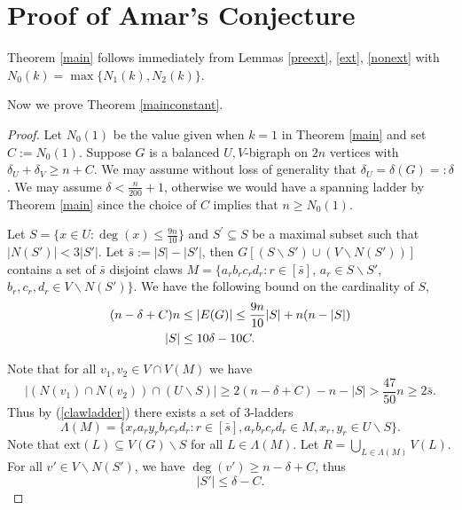 \documentclass[oneside,12pt]{memoir}
\newcommand{\ssm}{\smallsetminus}
\begin{document}
\section{Proof of Amar's Conjecture}

Theorem \ref{main} follows immediately from Lemmas \ref{preext}, \ref{ext}, \ref{nonext} with $N_0(k)=\max\{N_1(k),N_2(k)\}$.

Now we prove Theorem \ref{mainconstant}.%

\begin{proof}

Let $N_0(1)$ be the value given when $k=1$ in Theorem \ref{main} and set $C:=N_0(1)$.  Suppose $G$ is a balanced $U,V$-bigraph on $2n$ vertices with $\delta_U+\delta_V\geq n+C$.  We may assume without loss of generality that $\delta_U=\delta(G)=:\delta$. We may assume $\delta<\frac{n}{200}+1$, otherwise we would have a spanning ladder by Theorem \ref{main} since the choice of $C$ implies that $n\geq N_0(1)$.

Let $S=\{x\in U:\deg(x)\leq\frac{9n}{10}\}$ and $S^{\prime}\subseteq S$ be a maximal subset such that $| N(S')|<3|S'|$.  Let $\bar{s}:=|S|-|S'|$, then $G[(S\smallsetminus S')\cup (V\smallsetminus N(S'))]$ contains a set of $\bar{s}$ disjoint claws $M=\{a_rb_rc_rd_r:r\in[\bar{s}]$, $a_r\in S\ssm S'$, $b_r,c_r,d_r\in V\ssm N(S')\}$.
We have the following bound on the cardinality of $S$,
\begin{align}
(n-\delta+C)n &\leq|E(G)|\leq\frac{9n}{10}| S| +n(n-|S|)\notag \\
|S|&\leq 10\delta-10C.
\end{align}

Note that for all $v_1,v_2\in V\cap V(M)$ we have
\begin{equation}
|(N(v_1)\cap N(v_2))\cap(U\ssm S)|\geq 2(n-\delta+C)-n-|S|>\frac{47}{50}n\geq 2\bar{s}.\label{clawladder}
\end{equation}
Thus by (\ref{clawladder}) there exists a set of $3$-ladders $$\Lambda(M)=\{x_ra_ry_rb_rc_rd_r:r\in[\bar{s}], a_rb_rc_rd_r\in M, x_r,y_r\in U\ssm S\}.$$ Note that $\mathrm{ext}(L)\subseteq V(G)\smallsetminus S$ for all $L\in \Lambda(M)$.  Let $R=\bigcup_{L\in \Lambda(M)}V(L)$.  For all $v'\in V\ssm N(S')$, we have $\deg(v')\geq n-\delta+C$, thus 
\begin{equation}
|S'|\leq \delta-C. \label{S'}
\end{equation}


\end{proof}
\end{document}
